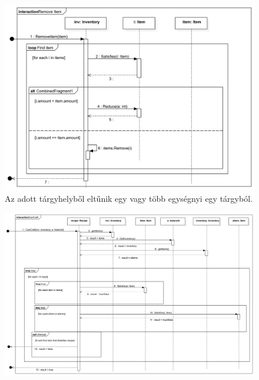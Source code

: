\begin{figure}[H] 
\centering 
\includegraphics[width=1\textwidth]{docs/3_Project/svg/Design Model!Inventory!Remove Item!Remove Item_29.png} 
\caption{Az adott tárgyhelyből eltűnik egy vagy több egységnyi egy tárgyból.} 
\end{figure} 

\begin{figure}[H] 
\centering 
\includegraphics[width=1\textwidth]{docs/3_Project/svg/Design Model!CanCraftSeq!Can Craft!CanCraft_30.png} 
\end{figure} 

